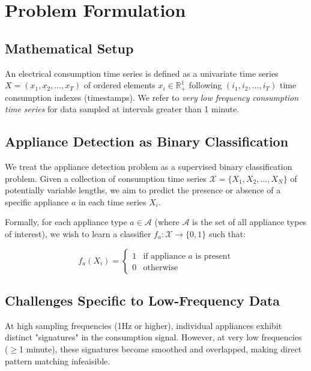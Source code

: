 \documentclass[conference]{IEEEtran}
\begin{document}
\section{Problem Formulation}
\label{sec:problem}

\subsection{Mathematical Setup}

An electrical consumption time series is defined as a univariate time series $X = (x_1, x_2, \ldots, x_T)$ of ordered elements $x_i \in \mathbb{R}^1_+$ following $(i_1, i_2, \ldots, i_T)$ time consumption indexes (timestamps). We refer to \textit{very low frequency consumption time series} for data sampled at intervals greater than 1 minute.

\subsection{Appliance Detection as Binary Classification}

We treat the appliance detection problem as a supervised binary classification problem. Given a collection of consumption time series $\mathcal{X} = \{X_1, X_2, \ldots, X_N\}$ of potentially variable lengths, we aim to predict the presence or absence of a specific appliance $a$ in each time series $X_i$.

Formally, for each appliance type $a \in \mathcal{A}$ (where $\mathcal{A}$ is the set of all appliance types of interest), we wish to learn a classifier $f_a: \mathcal{X} \rightarrow \{0, 1\}$ such that:

\begin{equation}
f_a(X_i) = \begin{cases} 
1 & \text{if appliance } a \text{ is present} \\
0 & \text{otherwise}
\end{cases}
\end{equation}

\subsection{Challenges Specific to Low-Frequency Data}

At high sampling frequencies (1Hz or higher), individual appliances exhibit distinct "signatures" in the consumption signal. However, at very low frequencies ($\geq$1 minute), these signatures become smoothed and overlapped, making direct pattern matching infeaisible.
\end{document}
